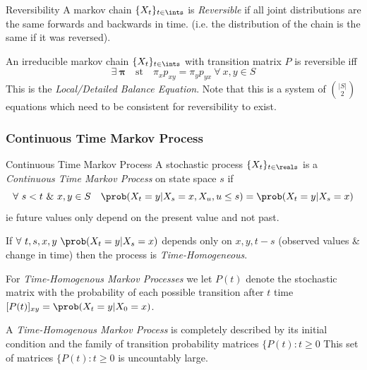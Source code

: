\documentclass[11pt,a4paper]{article}
\begin{document}
\begin{definition}{Reversibility}
  A markov chain $\{X_t\}_{t\in\ints}$ is \textit{Reversible} if all joint distributions are the same forwards and backwards in time. (i.e. the distribution of the chain is the same if it was reversed).
  \par An irreducible markov chain $\{X_t\}_{t\in\ints}$ with transition matrix $P$ is reversible iff
  \[\exists\ \pmb\pi\quad\text{st}\quad\pi_xp_{xy}=\pi_yp_{yx}\ \forall\ x,y\in S\]
  This is the \textit{Local/Detailed Balance Equation}. Note that this is a system of ${|S|\choose2}$ equations which need to be consistent for reversibility to exist.
\end{definition}

\subsubsection{Continuous Time Markov Process}

\begin{definition}{Continuous Time Markov Process}
  A stochastic process $\{X_t\}_{t\in\reals}$ is a \textit{Continuous Time Markov Process} on state space $s$ if
  \[ \forall\ s<t\ \&\ x,y\in S\quad\prob(X_t=y|X_s=x,X_u,u\leq s)=\prob(X_t=y|X_s=x) \]
  ie future values only depend on the present value and not past.
  \par If $\forall\ t,s,x,y\ \prob(X_t=y|X_s=x)$ depends only on $x,y,t-s$ (observed values \& change in time) then the process is \textit{Time-Homogeneous}.
  \par For \textit{Time-Homogenous Markov Processes} we let $P(t)$ denote the stochastic matrix with the probability of each possible transition after $t$ time $[P(t)]_{xy}=\prob(X_t=y|X_0=x)$.
\end{definition}

\begin{remark}{A \textit{Time-Homogenous Markov Process} is completely described by its initial condition and the family of transition probability matrices $\{P(t):t\geq0$}
  This set of matrices $\{P(t):t\geq0$ is uncountably large.
\end{remark}
\end{document}

